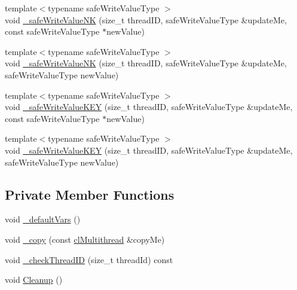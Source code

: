 \begin{DoxyCompactItemize}
\item 
{\footnotesize template$<$typename safeWriteValueType $>$ }\\void \hyperlink{classcl_multithread_a81b392fa3e2ace78a2d92bf8866bd313}{\_\-safeWriteValueNK} (size\_\-t threadID, safeWriteValueType \&updateMe, const safeWriteValueType $\ast$newValue)
\item 
{\footnotesize template$<$typename safeWriteValueType $>$ }\\void \hyperlink{classcl_multithread_ad8eed00851dda75dfca3d70e15b96c23}{\_\-safeWriteValueNK} (size\_\-t threadID, safeWriteValueType \&updateMe, safeWriteValueType newValue)
\item 
{\footnotesize template$<$typename safeWriteValueType $>$ }\\void \hyperlink{classcl_multithread_a512d22f834afefc1e484869a8455b615}{\_\-safeWriteValueKEY} (size\_\-t threadID, safeWriteValueType \&updateMe, const safeWriteValueType $\ast$newValue)
\item 
{\footnotesize template$<$typename safeWriteValueType $>$ }\\void \hyperlink{classcl_multithread_a58722a95970b094a46d287de5ad1fd88}{\_\-safeWriteValueKEY} (size\_\-t threadID, safeWriteValueType \&updateMe, safeWriteValueType newValue)
\end{DoxyCompactItemize}
\subsection*{Private Member Functions}
\begin{DoxyCompactItemize}
\item 
void \hyperlink{classcl_multithread_a9a42b3b20a9313bbd34c17a7b0c5a45b}{\_\-defaultVars} ()
\item 
void \hyperlink{classcl_multithread_ae7e872650bb474870bc34c2fd5985fc5}{\_\-copy} (const \hyperlink{classcl_multithread}{clMultithread} \&copyMe)
\item 
void \hyperlink{classcl_multithread_a58d38a15d35ac9c6a89dde71441a488f}{\_\-checkThreadID} (size\_\-t threadId) const 
\item 
void \hyperlink{classcl_multithread_a30e44b3ffaf8568123eac74f07ca26aa}{Cleanup} ()
\end{DoxyCompactItemize}
